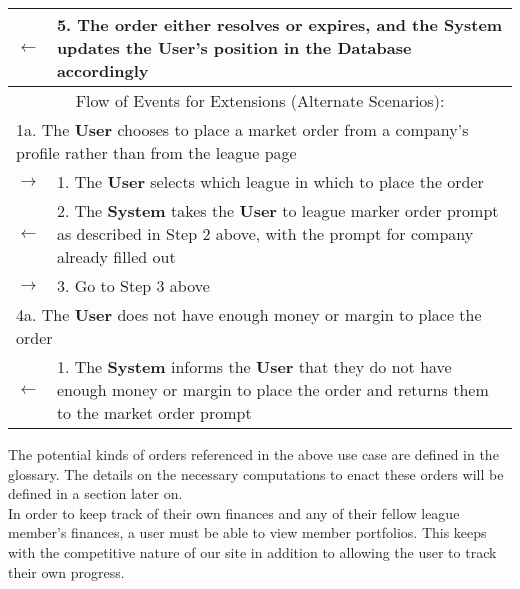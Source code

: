 \begin{centering}
\begin{longtable}{|p{1.2in} p{5in}|}
$\leftarrow$ & 5. The order either resolves or expires, and the \textbf{System} updates the \textbf{User}'s position in the \textbf{Database} accordingly \\
\hline
\multicolumn{2}{|c|}{\color{color1}Flow of Events for Extensions (Alternate Scenarios):} \\
\hline
\multicolumn{2}{|l|}{1a. The \textbf{User} chooses to place a market order from a company's profile rather than from the league page} \\
\hline
$\rightarrow$ & 1. The \textbf{User} selects which league in which to place the order  \\
$\leftarrow$ & 2. The \textbf{System} takes the \textbf{User} to league marker order prompt as described in Step 2 above, with the prompt for company already filled out \\
$\rightarrow$ & 3. Go to Step 3 above \\
\hline
\multicolumn{2}{|l|}{4a. The \textbf{User} does not have enough money or margin to place the order} \\
\hline
$\leftarrow$ & 1. The \textbf{System} informs the \textbf{User} that they do not have enough money or margin to place the order and returns them to the market order prompt \\
\hline 
\end{longtable}
\end{centering}

The potential kinds of orders referenced in the above use case are defined in the glossary. The details on the necessary computations to enact these orders will be defined in a section later on. \\

In order to keep track of their own finances and any of their fellow league member's finances, a user must be able to view member portfolios. This keeps with the competitive nature of our site in addition to allowing the user to track their own progress. \\

